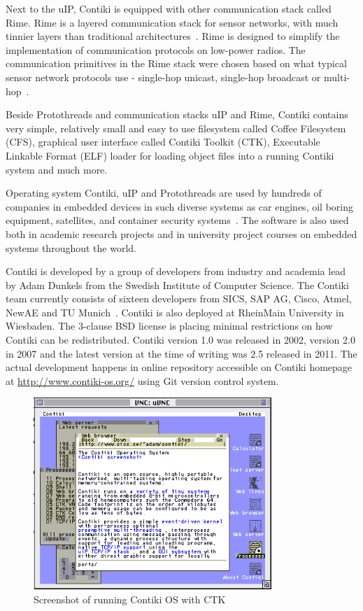 Next to the uIP, Contiki is equipped with other communication stack called Rime.
Rime is a layered communication stack for sensor networks,
with much tinnier layers than traditional architectures~\cite{paper-rime}.
Rime is designed to simplify the implementation of communication
protocols on low-power radios.
The communication primitives in the Rime stack were chosen
based on what typical sensor network protocols use -
single-hop unicast, single-hop broadcast or multi-hop~\cite{contiki-docs,paper-rime}.

Beside Protothreads and communication stacks uIP and Rime,
Contiki contains very simple, relatively small and easy to use filesystem
called Coffee Filesystem (CFS),
graphical user interface called Contiki Toolkit (CTK),
Executable Linkable Format (ELF) loader for loading object files into a running Contiki system
and much more.

Operating system Contiki, uIP and Protothreads are used by hundreds of companies in embedded devices in
such diverse systems as car engines, oil boring equipment, satellites, and container security systems~\cite{thesis-programming}.
The software is also used both in academic research
projects and in university project courses on embedded systems throughout the
world.

Contiki is developed by a group of developers from industry and academia
lead by Adam Dunkels from the Swedish Institute of Computer Science.
The Contiki team currently consists of sixteen developers from SICS,
SAP AG, Cisco, Atmel, NewAE and TU Munich~\cite{contiki-docs}.
Contiki is also deployed at RheinMain University in Wiesbaden.
The 3-clause BSD license is placing minimal restrictions on how Contiki can be redistributed.
Contiki version 1.0 was released in 2002, version 2.0 in 2007 and the latest version
at the time of writing was 2.5 released in 2011.
The actual development happens in online repository accessible on Contiki homepage at \url{http://www.contiki-os.org/}
using Git version control system.

\begin{figure}
  \centering
  \includegraphics[width=9cm,keepaspectratio]{fig/contiki-vnc.png}
  \caption{Screenshot of running Contiki OS with CTK}
  \label{fig:contiki}
  \bigskip
\end{figure}









